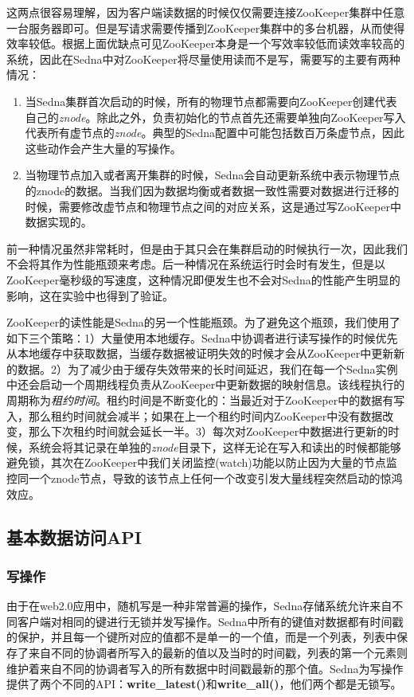 这两点很容易理解，因为客户端读数据的时候仅仅需要连接ZooKeeper集群中任意一台服务器即可。但是写请求需要传播到ZooKeeper集群中的多台机器，从而使得效率较低。根据上面优缺点可见ZooKeeper本身是一个写效率较低而读效率较高的系统，因此在Sedna中对ZooKeeper将尽量使用读而不是写，需要写的主要有两种情况：

\begin{enumerate}
  \item 当Sedna集群首次启动的时候，所有的物理节点都需要向ZooKeeper创建代表自己的\textit{znode}。除此之外，负责初始化的节点首先还需要单独向ZooKeeper写入代表所有虚节点的\textit{znode}。典型的Sedna配置中可能包括数百万条虚节点，因此这些动作会产生大量的写操作。
  
  \item 当物理节点加入或者离开集群的时候，Sedna会自动更新系统中表示物理节点的znode的数据。当我们因为数据均衡或者数据一致性需要对数据进行迁移的时候，需要修改虚节点和物理节点之间的对应关系，这是通过写ZooKeeper中数据实现的。
\end{enumerate}

前一种情况虽然非常耗时，但是由于其只会在集群启动的时候执行一次，因此我们不会将其作为性能瓶颈来考虑。后一种情况在系统运行时会时有发生，但是以ZooKeeper毫秒级的写速度，这种情况即便发生也不会对Sedna的性能产生明显的影响，这在实验中也得到了验证。

ZooKeeper的读性能是Sedna的另一个性能瓶颈。为了避免这个瓶颈，我们使用了如下三个策略：1）大量使用本地缓存。Sedna中协调者进行读写操作的时候优先从本地缓存中获取数据，当缓存数据被证明失效的时候才会从ZooKeeper中更新新的数据。2）为了减少由于缓存失效带来的长时间延迟，我们在每一个Sedna实例中还会启动一个周期线程负责从ZooKeeper中更新数据的映射信息。该线程执行的周期称为\textit{租约时间}。租约时间是不断变化的：当最近对于ZooKeeper中的数据有写入，那么租约时间就会减半；如果在上一个租约时间内ZooKeeper中没有数据改变，那么下次租约时间就会延长一半。3）每次对ZooKeeper中数据进行更新的时候，系统会将其记录在单独的\textit{znode}目录下，这样无论在写入和读出的时候都能够避免锁，其次在ZooKeeper中我们关闭监控(watch)功能以防止因为大量的节点监控同一个znode节点，导致的该节点上任何一个改变引发大量线程突然启动的惊鸿效应。

\subsection{基本数据访问API}
\subsubsection{写操作}
由于在web2.0应用中，随机写是一种非常普遍的操作，Sedna存储系统允许来自不同客户端对相同的键进行无锁并发写操作。Sedna中所有的键值对数据都有时间戳的保护，并且每一个键所对应的值都不是单一的一个值，而是一个列表，列表中保存了来自不同的协调者所写入的最新的值以及当时的时间戳，列表的第一个元素则维护着来自不同的协调者写入的所有数据中时间戳最新的那个值。Sedna为写操作提供了两个不同的API：\textbf{write\_latest()}和\textbf{write\_all()}，他们两个都是无锁写。

